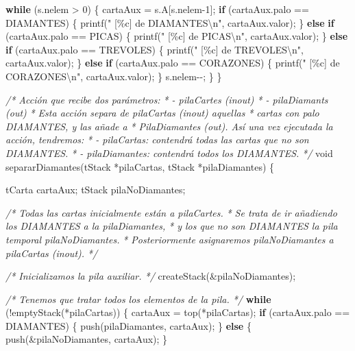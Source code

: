 \documentclass[
]{book}
\newenvironment{Shaded}{\begin{snugshade}}{\end{snugshade}}
\newcommand{\CommentTok}[1]{\textcolor[rgb]{0.56,0.35,0.01}{\textit{#1}}}
\newcommand{\ControlFlowTok}[1]{\textcolor[rgb]{0.13,0.29,0.53}{\textbf{#1}}}
\newcommand{\DataTypeTok}[1]{\textcolor[rgb]{0.13,0.29,0.53}{#1}}
\newcommand{\DecValTok}[1]{\textcolor[rgb]{0.00,0.00,0.81}{#1}}
\newcommand{\NormalTok}[1]{#1}
\newcommand{\SpecialCharTok}[1]{\textcolor[rgb]{0.00,0.00,0.00}{#1}}
\newcommand{\StringTok}[1]{\textcolor[rgb]{0.31,0.60,0.02}{#1}}
\begin{document}
\begin{Shaded}
\begin{Highlighting}[]
    \ControlFlowTok{while}\NormalTok{ (s.nelem \textgreater{} }\DecValTok{0}\NormalTok{) \{}
\NormalTok{        cartaAux = s.A[s.nelem{-}}\DecValTok{1}\NormalTok{]; }
        \ControlFlowTok{if}\NormalTok{ (cartaAux.palo == DIAMANTES) \{}
\NormalTok{            printf(}\StringTok{"  [\%c] de DIAMANTES}\SpecialCharTok{\textbackslash{}n}\StringTok{"}\NormalTok{, cartaAux.valor);}
\NormalTok{        \} }\ControlFlowTok{else} \ControlFlowTok{if}\NormalTok{ (cartaAux.palo == PICAS) \{}
\NormalTok{            printf(}\StringTok{"  [\%c] de PICAS}\SpecialCharTok{\textbackslash{}n}\StringTok{"}\NormalTok{, cartaAux.valor);}
\NormalTok{        \} }\ControlFlowTok{else} \ControlFlowTok{if}\NormalTok{ (cartaAux.palo == TREVOLES) \{}
\NormalTok{            printf(}\StringTok{"  [\%c] de TREVOLES}\SpecialCharTok{\textbackslash{}n}\StringTok{"}\NormalTok{, cartaAux.valor);}
\NormalTok{        \} }\ControlFlowTok{else} \ControlFlowTok{if}\NormalTok{ (cartaAux.palo == CORAZONES) \{}
\NormalTok{            printf(}\StringTok{"  [\%c] de CORAZONES}\SpecialCharTok{\textbackslash{}n}\StringTok{"}\NormalTok{, cartaAux.valor);}
\NormalTok{        \}}
\NormalTok{        s.nelem{-}{-};}
\NormalTok{    \}}
\NormalTok{\}}

\CommentTok{/* Acción que recibe dos parámetros:}
\CommentTok{ * {-} pilaCartes (inout)}
\CommentTok{ * {-} pilaDiamants (out)}
\CommentTok{ * Esta acción separa de pilaCartas (inout) aquellas}
\CommentTok{ * cartas con palo DIAMANTES, y las añade a}
\CommentTok{ * PilaDiamantes (out). Así una vez ejecutada la acción, tendremos:}
\CommentTok{ * {-} pilaCartas: contendrá todas las cartas que no son DIAMANTES.}
\CommentTok{ * {-} pilaDiamantes: contendrá todos los DIAMANTES.}
\CommentTok{ */}
\DataTypeTok{void}\NormalTok{ separarDiamantes(tStack *pilaCartas, tStack *pilaDiamantes) \{}
    
\NormalTok{    tCarta cartaAux;}
\NormalTok{    tStack pilaNoDiamantes;}
    
    \CommentTok{/* Todas las cartas inicialmente están a pilaCartes.}
\CommentTok{     * Se trata de ir añadiendo los DIAMANTES a la pilaDiamantes,}
\CommentTok{     * y los que no son DIAMANTES la pila temporal pilaNoDiamantes.}
\CommentTok{     * Posteriormente asignaremos pilaNoDiamantes a pilaCartas (inout).}
\CommentTok{     */}
    
    \CommentTok{/* Inicializamos la pila auxiliar. */}
\NormalTok{    createStack(\&pilaNoDiamantes);}
    
    \CommentTok{/* Tenemos que tratar todos los elementos de la pila. */}
    \ControlFlowTok{while}\NormalTok{ (!emptyStack(*pilaCartas)) \{}
\NormalTok{        cartaAux = top(*pilaCartas);}
        \ControlFlowTok{if}\NormalTok{ (cartaAux.palo == DIAMANTES) \{}
\NormalTok{            push(pilaDiamantes, cartaAux);}
\NormalTok{        \} }\ControlFlowTok{else}\NormalTok{ \{}
\NormalTok{            push(\&pilaNoDiamantes, cartaAux);            }
\NormalTok{        \}}
        

\end{Highlighting}
\end{Shaded}
\end{document}
